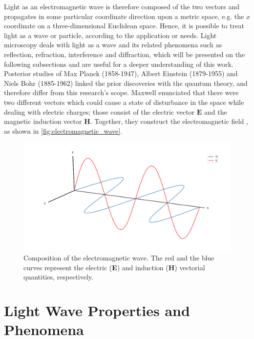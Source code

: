 Light as an electromagnetic wave is therefore composed of the two vectors and propagates in some particular coordinate direction upon a metric space, e.g. the $\mathit{x}$ coordinate on a three-dimensional Euclidean space. Hence, it is possible to treat light as a wave or particle, according to the application or needs. Light microscopy deals with light as a wave and its related phenomena such as reflection, refraction, interference and diffraction, which will be presented on the following subsections and are useful for a deeper understanding of this work. Posterior studies of Max Planck (1858-1947), Albert Einstein (1879-1955) and Niels Bohr (1885-1962) \cite{fowles1989introduction} linked the prior discoveries with the quantum theory, and therefore differ from this research's scope. Maxwell enunciated that there were two different vectors which could cause a state of disturbance in the space while dealing with electric charges; those consist of the electric vector $\mathit{\mathbf{E}}$ and the magnetic induction vector $\mathit{\mathbf{H}}$. Together, they construct the electromagnetic field \cite{born1999principles}, as shown in \autoref{fig:electromagnetic_wave}.

\begin{figure}[htb]
	\centering
	\caption{\label{fig:electromagnetic_wave} 
		Composition of the electromagnetic wave. The red and the blue curves represent the electric (\textbf{E}) and induction (\textbf{H}) vectorial quantities, respectively.}
	\begin{center}
	    \includegraphics[scale=0.3]
			{images/fig2.png}
	\end{center}
	\centering
	\fautor
\end{figure}

\section{Light Wave Properties and Phenomena}

